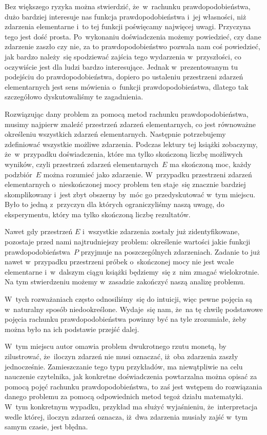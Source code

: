 \documentclass[a4paper,11pt]{article}
\numberwithin{equation}{section}
\begin{document}
Bez większego ryzyka można stwierdzić, że~w~rachunku prawdopodobieństwa,
dużo bardziej interesuje nas funkcja prawdopodobieństwa i~jej własności,
niż zdarzenia elementarne i~to tej funkcji poświęcamy najwięcej uwagi.
Przyczyna tego jest dość prosta. Po~wykonaniu doświadczenia możemy
powiedzieć, czy dane zdarzenie zaszło czy nie, za to prawdopodobieństwo
pozwala nam coś powiedzieć, jak bardzo należy~się spodziewać zajścia tego
wydarzenia w~przyszłości, co oczywiście jest dla ludzi bardzo interesujące.
Jednak w~prezentowanym tu podejściu do prawdopodobieństwa, dopiero po
ustaleniu przestrzeni zdarzeń elementarnych jest sens mówienia o~funkcji
prawdopodobieństwa, dlatego tak szczegółowo dyskutowaliśmy te zagadnienia.

Rozwiązując dany problem za pomocą metod rachunku prawdopodobieństwa,
musimy najpierw znaleźć przestrzeń zdarzeń elementarnych, co jest równoważne
określeniu wszystkich zdarzeń elementarnych. Następnie potrzebujemy
zdefiniować wszystkie możliwe zdarzenia. Podczas lektury tej książki
zobaczymy, że~w~przypadku doświadczenia, które ma tylko skończoną liczbę
możliwych wyników, czyli przestrzeń zdarzeń elementarnych~$E$ ma skończoną
moc, każdy
podzbiór~$E$ można rozumieć jako zdarzenie. W~przypadku przestrzeni zdarzeń
elementarnych o~nieskończonej mocy problem ten staje~się znacznie bardziej
skomplikowany i~jest zbyt obszerny by~móc go przedyskutować w~tym miejscu.
Było to jedną z~przyczyn dla których ograniczyliśmy naszą uwagę, do
eksperymentu, który ma tylko skończoną liczbę rezultatów.

Nawet gdy przestrzeń $E$ i~wszystkie zdarzenia zostały już zidentyfikowane,
pozostaje przed nami najtrudniejszy problem: określenie wartości jakie
funkcji prawdopodobieństwa~$P$ przyjmuje na poszczególnych zdarzeniach.
Zadanie to już nawet w~przypadku przestrzeni próbek o~skończonej mocy nie
jest wcale elementarne i~w~dalszym ciągu książki będziemy~się z~nim zmagać
wielokrotnie. Na tym stwierdzeniu możemy w~zasadzie zakończyć naszą analizę
problemu.

W~tych rozważaniach często odnosiliśmy~się do intuicji, więc pewne pojęcia
są w~naturalny sposób niedookreślone. Wydaje~się nam, że~na tę chwilę
podstawowe pojęcia rachunku prawdopodobieństwa powinny być na tyle
zrozumiałe, żeby można było na ich podstawie przejść dalej.

\VerSpaceFour





\noindent
{} W~tym miejscu autor omawia problem dwukrotnego rzutu monetą,
by zilustrować, że~iloczyn zdarzeń nie musi oznaczać, iż~oba zdarzenia
zaszły jednocześnie. Zamieszczanie tego typu przykładów, ma niewątpliwie na
celu nauczenie czytelnika, jak konkretne doświadczenia powtarzalna można
opisać za pomocą pojęć rachunku prawdopodobieństwa, to zaś jest wstępem
do rozwiązania danego problemu za pomocą odpowiednich metod tegoż działu
matematyki. W~tym konkretnym wypadku, przykład ma służyć wyjaśnieniu,
że~interpretacja wedle której, iloczyn zdarzeń oznacza, iż~dwa zdarzenia
musiały zajść w~tym samym czasie, jest błędna.
\end{document}
